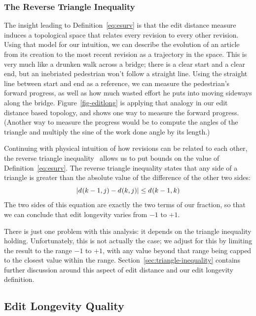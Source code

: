 \subsubsection{The Reverse Triangle Inequality}

The insight leading to Definition~\ref{eq:esurv} is that the edit distance
measure induces a topological space that relates every revision to
every other revision.
Using that model for our intuition, we can describe the evolution of
an article from its creation to the most recent revision as a trajectory
in the space.
This is very much like a drunken walk across a bridge;
there is a clear start and a clear end, but an inebriated
pedestrian won't follow a straight line.
Using the straight line between start and end as a reference,
we can measure the pedestrian's forward progress, as well as
how much wasted effort he puts into moving sideways along the bridge.
Figure~\ref{fig-editlong} is applying that analogy in our
edit distance based topology, and shows one way to measure
the forward progress.
(Another way to measure the progress would be to compute the
angles of the triangle and multiply the sine of the
work done angle by its length.)

Continuing with physical intuition of how revisions can be
related to each other, the reverse triangle
inequality~\cite{wiki:TriangleInequality} allows us to put bounds
on the value of Definition~\ref{eq:esurv}.
The reverse triangle inequality states that any side of
a triangle is greater than the absolute value of the difference
of the other two sides:
\begin{equation}
| d_{}(k-1,j) - d_{}(k,j) | \le d_{}(k-1,k)
\end{equation}
The two sides of this equation are exactly the two terms
of our fraction, so that we can conclude that edit longevity
varies from $-1$ to $+1$.

There is just one problem with this analysis: it depends on
the triangle inequality holding.
Unfortunately, this is not actually the case; we adjust for
this by limiting the result to the range $-1$ to $+1$,
with any value beyond that range being capped to the closest
value within the range.
Section~\ref{sec:triangle-inequality} contains further discussion
around this aspect of edit distance and our edit longevity
definition.

\subsection{Edit Longevity Quality}

